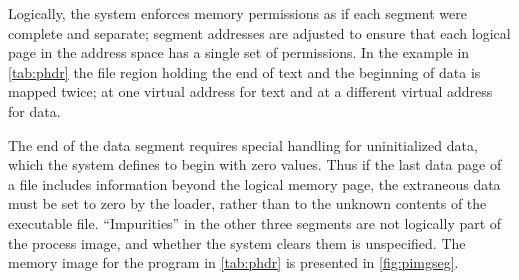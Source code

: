 \documentclass[USenglish,fontsize=11pt,twoside,%
  toc=bib,toc=idx,toc=graduated,numbers=noendperiod,
  bookmarks=true,
  bookmarksnumbered=true,
  bookmarksopen=true,
  bookmarksopenlevel=1,
  breaklinks=true,
  colorlinks=true,
  linkcolor=black,
  pdfpagelayout={TwoPageRight},
  pdfusetitle=true
]{scrreprt}
\begin{document}
Logically, the system enforces memory permissions as if each segment
were complete and separate; segment addresses are adjusted to ensure
that each logical page in the address space has a single set of
permissions.  In the example in \cref{tab:phdr} the file region
holding the end of text and the beginning of data is mapped twice; at
one virtual address for text and at a different virtual address for
data.

The end of the data segment requires special handling for
uninitialized data, which the system defines to begin with zero
values.  Thus if the last data page of a file includes information
beyond the logical memory page, the extraneous data must be set to
zero by the loader, rather than to the unknown contents of the
executable file.  ``Impurities'' in the other three segments are not
logically part of the process image, and whether the system clears
them is unspecified.  The memory image for the program in
\cref{tab:phdr} is presented in \cref{fig:pimgseg}.
\end{document}
